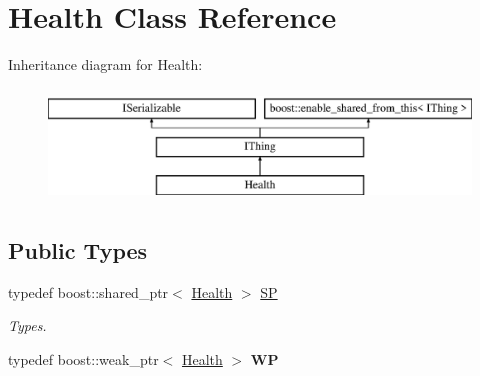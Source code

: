 \hypertarget{class_health}{}\section{Health Class Reference}
\label{class_health}
Inheritance diagram for Health\+:\begin{figure}[H]
\begin{center}
\leavevmode
\includegraphics[height=3.000000cm]{class_health}
\end{center}
\end{figure}
\subsection*{Public Types}
\begin{DoxyCompactItemize}
\item 
\mbox{\label{class_health_ae99ee603426761f4a2c1372c78a4275a}} 
typedef boost\+::shared\+\_\+ptr$<$ \hyperlink{class_health}{Health} $>$ \hyperlink{class_health_ae99ee603426761f4a2c1372c78a4275a}{SP}
\begin{DoxyCompactList}\small\item\em Types. \end{DoxyCompactList}\item 
\mbox{\label{class_health_a603efc632d2cc2aa2a8abf8aaa03077e}} 
typedef boost\+::weak\+\_\+ptr$<$ \hyperlink{class_health}{Health} $>$ {\bfseries WP}
\end{DoxyCompactItemize}

